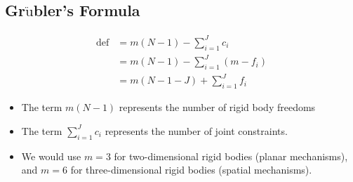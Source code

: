 \documentclass[10pt]{article}
\begin{document}
\subsection*{Gr$\ddot{\text{u}}$bler's Formula}
\begin{align*}
    \text{def} &= m(N - 1) - \sum_{i = 1}^J c_i \\
    &= m(N - 1) - \sum_{i = 1}^J(m - f_i)\\
    &= m(N - 1 - J) + \sum_{i = 1}^J f_i
\end{align*}
\begin{itemize}
    \item The term $m(N - 1)$ represents the number of rigid body freedoms
    \item The term $\sum_{i = 1}^J c_i$ represents the number of joint constraints.
    \item We would use $m = 3$ for two-dimensional rigid bodies (planar mechanisms), and $m = 6$ for three-dimensional rigid bodies (spatial mechanisms).
\end{itemize}
\end{document}
